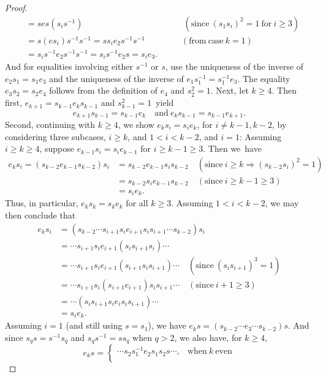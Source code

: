 \documentclass{surv-l}
\numberwithin{equation}{section}
\numberwithin{table}{section}
\numberwithin{figure}{section}
\theoremstyle{definition}
\begin{document}
\begin{proof}
\begin{align*}
&=ses(s_{i}s^{-1})\qquad\qquad\qquad\qquad\qquad\quad\enspace\ (\mathrm{since}\ (s_{1}s_{i})^{2}=1\ \mathrm{for}\ i\geq 3) \\
&=s(es_{i})s^{-1}s^{-1}=ss_{i}e_{2}s^{-1}s^{-1}\qquad\qquad\ (\mathrm{from\ case}\ k=1) \\
&=s_{i}s^{-1}e_{2}s^{-1}s^{-1}=s_{i}s^{-1}e_{2}s=s_{i}e_{3}.
\end{align*}
And for equalities involving either $s^{-1}$ or $s$, use the
uniqueness of the inverse of $e_{2}s_{1}=s_{1}e_{3}$ and the
uniqueness of the inverse of
$e_{1}s_{1}^{-1}=s_{1}^{-1}e_{3}$. The equality
$e_{3}s_{2}=s_{2}e_{4}$ follows from the definition of $e_{4}$
and $s_{2}^{2}=1$. Next, let $k\geq 4$. Then first,
$e_{k+1}=s_{k-1}e_{k}s_{k-1}$ and $s_{k-1}^{2}=1$~yield
\[
e_{k+1}s_{k-1}=s_{k-1}e_{k}\quad \mathrm{and}\ e_{k}s_{k-1}=s_{k-1}e_{k+1}.
\]
Second, continuing with $k\geq 4$, we show
$e_{k}s_{i}=s_{i}e_{k}$, for $i\neq k-1, k-2$, by considering
three subcases, $i\geq k$, and $1<i<k-2$, and $i=1$: Assuming
$i\geq k\geq 4$, suppose $e_{k-1}s_{i}=s_{i}e_{k-1}$ for
$i\geq k-1 \geq 3$. Then we~have
\begin{align*}
e_{k}s_{i}=(s_{k-2}e_{k-1}s_{k-2})s_{i} &=s_{k-2}e_{k-1}s_{i}s_{k-2}\quad
(\mathrm{since}\ i\geq k\Rightarrow(s_{k-2}s_{i})^{2}=1) \\
&=s_{k-2}s_{i}e_{k-1}s_{k-2}\quad (\mathrm{since}\ i\geq k-1\geq 3) \\
&=s_{i}e_{k}.
\end{align*}
Thus, in particular, $e_{k}s_{k}=s_{k}e_{k}$ for all $k\geq 3$.
Assuming $1<i<k-2$, we may then conclude that
\begin{align*}
e_{k}s_{i}&=(s_{k-2}\cdots s_{i+1}s_{i}e_{i+1}s_i s_{i+1}\cdots s_{k-2})s_{i} \\
&=\cdots s_{i+1}s_{i}e_{i+1}(s_{i}s_{i+1}s_{i})\cdots \\
&=\cdots s_{i+1}s_{i}e_{i+1}(s_{i+1}s_{i}s_{i+1})\cdots\quad (\mathrm{since}\
(s_{i}s_{i+1})^{3}=1) \\
&=\cdots s_{i+1}s_{i}(s_{i+1}e_{i+1})s_{i}s_{i+1}\cdots\quad (\mathrm{since}\ i+1\geq 3) \\
&=\cdots(s_is_{i+1}s_ie_is_is_{i+1})\cdots \\
&=s_{i}e_{k}.
\end{align*}
Assuming $i=1$ (and still using $s=s_{1}$), we have
$e_{k}s=(s_{k-2}\cdots e_{3}\cdots s_{k-2})s$. And since
$s_{q}s=s^{-1}s_{q}$ and $s_{q}s^{-1}=ss_{q}$ when $q>2$, we also
have, for $k\geq 4$,
\[
e_{k}s=\begin{cases}
\cdots s_{2}s_{1}^{-1}e_{2}s_{1}s_{2}s\cdots, &\mathrm{when}\ k\ \mathrm{even}\\

\end{cases}\]
\end{proof}
\end{document}
